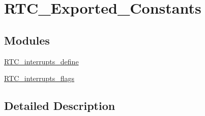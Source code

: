 \hypertarget{group___r_t_c___exported___constants}{}\section{R\+T\+C\+\_\+\+Exported\+\_\+\+Constants}
\label{group___r_t_c___exported___constants}
\subsection*{Modules}
\begin{DoxyCompactItemize}
\item 
\mbox{\hyperlink{group___r_t_c__interrupts__define}{R\+T\+C\+\_\+interrupts\+\_\+define}}
\item 
\mbox{\hyperlink{group___r_t_c__interrupts__flags}{R\+T\+C\+\_\+interrupts\+\_\+flags}}
\end{DoxyCompactItemize}


\subsection{Detailed Description}
